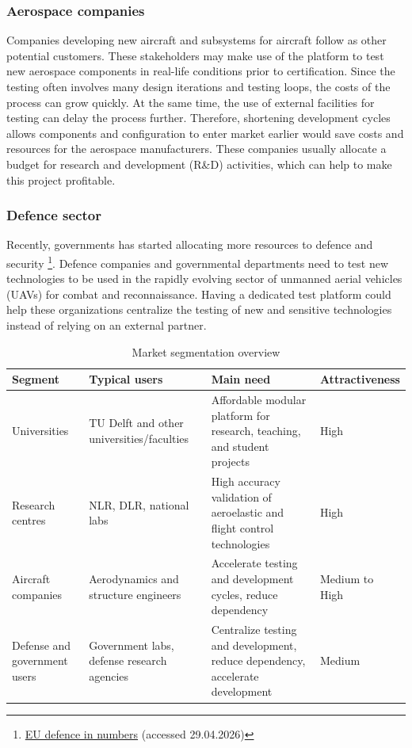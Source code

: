\subsubsection{Aerospace companies}
Companies developing new aircraft and subsystems for aircraft follow as other potential customers. These stakeholders may make use of the platform to test new aerospace components in real-life conditions prior to certification. Since the testing often involves many design iterations and testing loops, the costs of the process can grow quickly. At the same time, the use of external facilities for testing can delay the process further. Therefore, shortening development cycles allows components and configuration to enter market earlier would save costs and resources for the aerospace manufacturers. These companies usually allocate a budget for research and development (R\&D) activities, which can help to make this project profitable.


\subsubsection{Defence sector}
Recently, governments has started allocating more resources to defence and security \footnote{\href{https://www.consilium.europa.eu/en/policies/defence-numbers/}{EU defence in numbers} (accessed 29.04.2026)}. Defence companies and governmental departments need to test new technologies to be used in the rapidly evolving sector of unmanned aerial vehicles (UAVs) for combat and reconnaissance. Having a dedicated test platform could help these organizations centralize the testing of new and sensitive technologies instead of relying on an external partner.

\begin{table}[H]
    \centering
    \caption{Market segmentation overview}
    \begin{tabular}{|p{3cm}|p{4cm}|p{4.5cm}|p{2.5cm}|}
        \hline
        \textbf{Segment} & \textbf{Typical users} & \textbf{Main need} & \textbf{Attractiveness} \\
        \hline
        Universities & TU Delft and other universities/faculties & Affordable modular platform for research, teaching, and student projects & High \\
        \hline
        Research centres & NLR, DLR, national labs & High accuracy validation of aeroelastic and flight control technologies & High \\
        \hline
        Aircraft companies & Aerodynamics and structure engineers & Accelerate testing and development cycles, reduce dependency & Medium to High \\
        \hline
        Defense and government users & Government labs, defense research agencies & Centralize testing and development, reduce dependency, accelerate development & Medium \\
        \hline
    \end{tabular}
    \label{tab:market_seg}
\end{table}

